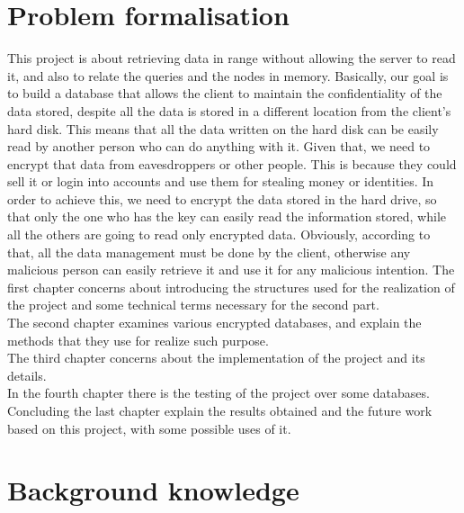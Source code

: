 \section{Problem formalisation}
This project is about retrieving data in range without allowing the server to read it, and also to relate the queries and the nodes in memory. 
Basically, our goal is to build a database that allows the client to maintain the confidentiality of the data stored, despite all the data is stored in a different location from the client's hard disk. This means that all the data written on the hard disk can be easily read by another person who can do anything with it. 
Given that, we need to encrypt that data from eavesdroppers or other people. This is because they could sell it or login into accounts and use them for stealing money or identities. In order to achieve this, we need to encrypt the data stored in the hard drive, so that only the one who has the key can easily read the information stored, while all the others are going to read only encrypted data.
Obviously, according to that, all the data management must be done by the client, otherwise any malicious person can easily retrieve it and use it for any malicious intention.
The first chapter concerns about introducing the structures used for the realization of the project and some technical terms necessary for the second part.
\\
The second chapter examines various encrypted databases, and explain the methods that they use for realize such purpose.
\\
The third chapter concerns about the implementation of the project and its details.
\\In the fourth chapter there is the testing of the project over some databases.
\\Concluding the last chapter explain the results obtained and the future work based on this project, with some possible uses of it.


\section{Background knowledge}
